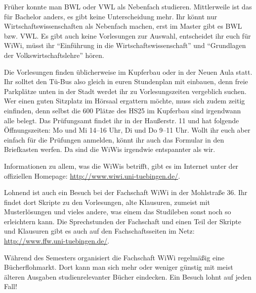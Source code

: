 
Früher konnte man BWL oder VWL als Nebenfach studieren. Mittlerweile ist das für Bachelor anders, es gibt keine Unterscheidung mehr. Ihr könnt nur Wirtschaftswissenschaften als Nebenfach machen, erst im Master gibt es BWL bzw. VWL. Es gibt auch keine Vorlesungen zur Auswahl, entscheidet ihr euch für WiWi, müsst ihr "`Einführung in die Wirtschaftswissenschaft"' und "`Grundlagen der Volkswirtschaftslehre"' hören. 

Die Vorlesungen finden üblicherweise im Kupferbau oder in der Neuen Aula statt. Ihr solltet den Tü-Bus also gleich in euren Stundenplan mit einbauen, denn freie Parkplätze unten in der Stadt werdet ihr zu Vorlesungszeiten vergeblich suchen. Wer einen guten Sitzplatz im Hörsaal ergattern möchte, muss sich zudem zeitig einfinden, denn selbst die 600 Plätze des HS25 im Kupferbau sind irgendwann alle belegt.
Das Prüfungsamt findet ihr in der Haußerstr. 11 und hat folgende Öffnungszeiten:	Mo und Mi 14--16 Uhr, 	Di und Do 9--11 Uhr. Wollt ihr euch aber einfach für die Prüfungen anmelden, könnt ihr auch das Formular in den Briefkasten werfen. Da sind die WiWis irgendwie entspannter als wir.

Informationen zu allem, was die WiWis betrifft, gibt es im Internet unter der offiziellen Homepage: \url{http://www.wiwi.uni-tuebingen.de/}.  

Lohnend ist auch ein Besuch bei der Fachschaft WiWi in der Mohlstraße 36. Ihr findet dort Skripte zu den Vorlesungen, alte Klausuren, zumeist mit Musterlösungen und vieles andere, was einem das Studileben sonst noch so erleichtern kann.  Die Sprechstunden der Fachschaft und einen Teil der Skripte und Klausuren gibt es auch auf den Fachschaftsseiten im Netz: \url{http://www.ffw.uni-tuebingen.de/}.

Während des Semesters organisiert die Fachschaft WiWi regelmäßig eine Bücherflohmarkt. Dort kann man sich mehr oder weniger günstig mit meist älteren Ausgaben studienrelevanter Bücher eindecken. Ein Besuch lohnt auf jeden Fall!
